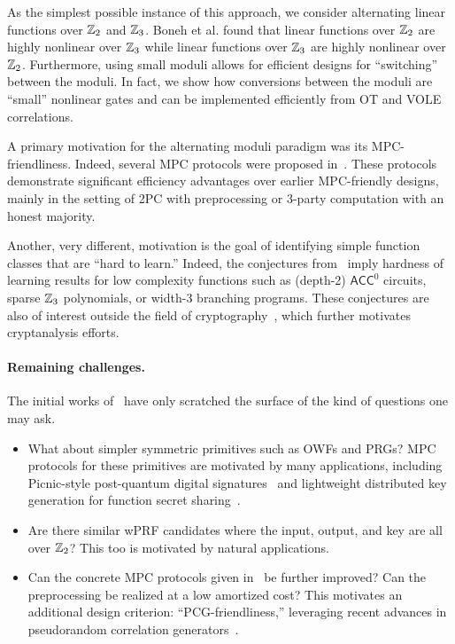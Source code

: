 As the simplest possible instance of this approach, we consider alternating linear functions over $\mathbb{Z}_2$ and $\mathbb{Z}_3$. Boneh et al. found that linear functions over $\mathbb{Z}_2$ are highly nonlinear over $\mathbb{Z}_3$ while linear functions over $\mathbb{Z}_3$ are highly nonlinear over $\mathbb{Z}_2$. Furthermore, using small moduli allows for efficient designs for ``switching'' between the moduli. In fact, we show how conversions between the moduli are “small” nonlinear gates and can be implemented efficiently from OT and VOLE correlations.
\fi

A primary motivation for the alternating moduli paradigm was its MPC-friendliness. Indeed, several MPC protocols were proposed in~\cite{boneh2018-darkmatter}. These protocols demonstrate significant efficiency advantages over earlier MPC-friendly designs, mainly in the setting of 2PC with preprocessing or 3-party computation with an honest majority. 

Another, very different, motivation is the goal of identifying simple function classes that are ``hard to learn.''  Indeed,  the conjectures from~\cite{boneh2018-darkmatter} imply hardness of learning results for low complexity functions such as (depth-2) $\mathsf{ACC}^0$ circuits, sparse $\mathbb{Z}_3$ polynomials, or width-3 branching programs. These conjectures are also of interest outside the field of cryptography~\cite{Chen19,FilmusIKK20,ChenR20,KabanetsKLMO20}, which further motivates cryptanalysis efforts.

\paragraph{Remaining challenges.} The initial works of~\cite{boneh2018-darkmatter,cheon2020-adventures} have only scratched the surface of the kind of questions one may ask. 
\begin{itemize}
\item
What about simpler symmetric primitives such as OWFs and PRGs? MPC protocols for these primitives are motivated by many applications, including Picnic-style post-quantum digital signatures~\cite{Picnicrefs} and lightweight distributed key generation for function secret sharing~\cite{Doernershelat,FSS-EC21}.
\item Are there similar wPRF candidates where the input, output, and key are all over $\mathbb{Z}_2$? This too is motivated by natural applications.
\item Can the concrete MPC protocols given in~\cite{boneh2018-darkmatter} be further improved? Can the preprocessing be realized at a low amortized cost? This motivates an additional design criterion: ``PCG-friendliness,'' leveraging recent advances in pseudorandom correlation generators~\cite{BCGI18,BoyleetalCCS19,Ferret}.
\end{itemize}

